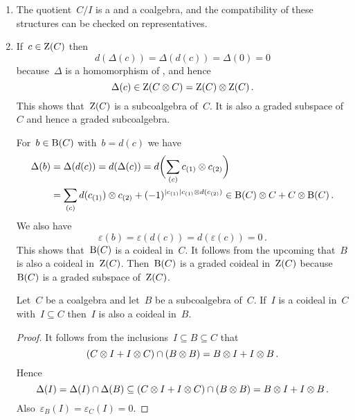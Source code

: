 \begin{enumerate}[start=3]
  \item
    The quotient~$C/I$ is a {\dgv} and a coalgebra, and the compatibility of these structures can be checked on representatives.
  \item
    If~$c \in \operatorname{Z}(C)$ then
    \[
      d(\Delta(c))
      =
      \Delta(d(c))
      =
      \Delta(0)
      =
      0
    \]
    because~$\Delta$ is a homomorphism of {\dgvs}, and hence
    \[
      \Delta(c)
      \in
      \operatorname{Z}(C \otimes C)
      =
      \operatorname{Z}(C) \otimes \operatorname{Z}(C) \,.
    \]
    This shows that~$\operatorname{Z}(C)$ is a subcoalgebra of~$C$.
    It is also a graded subspace of~$C$ and hence a graded subcoalgebra.

    For~$b \in \operatorname{B}(C)$ with~$b = d(c)$ we have
    \begin{align*}
      \Delta(b)
      &=
      \Delta(d(c))
      =
      d(\Delta(c))
      =
      d\biggl( \sum_{(c)} c_{(1)} \otimes c_{(2)} \biggr)
      \\
      &=
      \sum_{(c)}
      d(c_{(1)}) \otimes c_{(2)}
      +
      (-1)^{\lvert c_{(1)}\rvert c_{(1)} \otimes d(c_{(2)})}
      \in
      \operatorname{B}(C) \otimes C + C \otimes \operatorname{B}(C) \,.
    \end{align*}
    We also have
    \[
      \varepsilon(b)
      =
      \varepsilon(d(c))
      =
      d(\varepsilon(c))
      =
      0 \,.
    \]
    This shows that~$\operatorname{B}(C)$ is a coideal in~$C$.
    It follows from the upcoming  that~$B$ is also a coideal in~$\operatorname{Z}(C)$.
    Then~$\operatorname{B}(C)$ is a graded coideal in~$\operatorname{Z}(C)$ because~$\operatorname{B}(C)$ is a graded subspace of~$\operatorname{Z}(C)$.

    \begin{lemma}
      \label{restriction of coideals}
      Let~$C$ be a coalgebra and let~$B$ be a subcoalgebra of~$C$.
      If~$I$ is a coideal in~$C$ with~$I \subseteq C$ then~$I$ is also a coideal in~$B$.
    \end{lemma}

    \begin{proof}
      It follows from the inclusions~$I \subseteq B \subseteq C$ that
      \[
        (C \otimes I + I \otimes C) \cap (B \otimes B)
        =
        B \otimes I + I \otimes B \,.
      \]
      Hence
      \[
        \Delta(I)
        =
        \Delta(I) \cap \Delta(B)
        \subseteq
        (C \otimes I + I \otimes C) \cap (B \otimes B)
        =
        B \otimes I + I \otimes B \,.
      \]
      Also~$\varepsilon_B(I) = \varepsilon_C(I) = 0$.
    \end{proof}
\end{enumerate}





